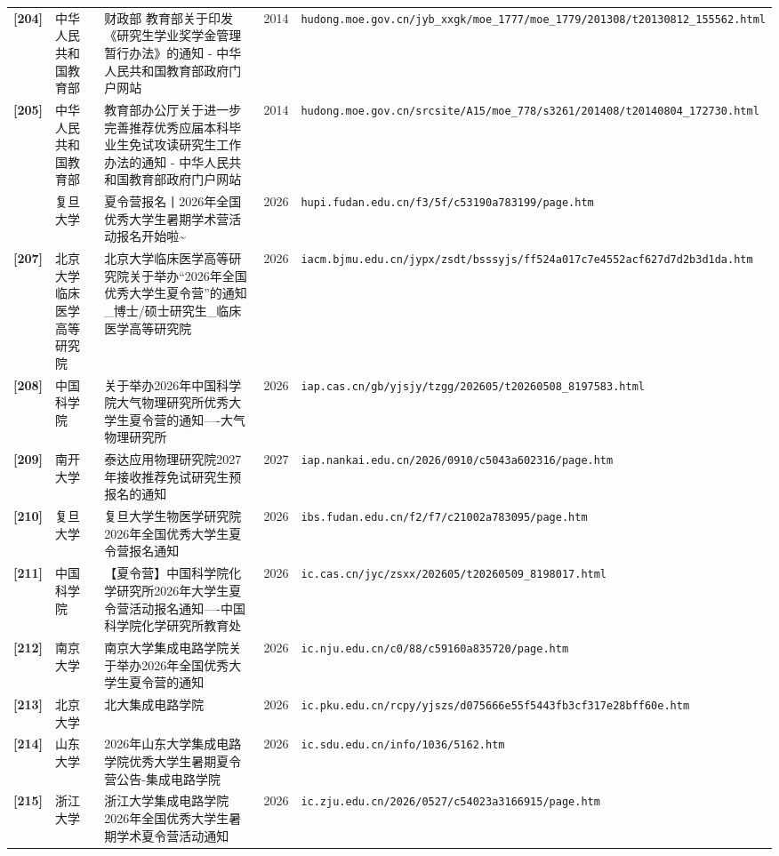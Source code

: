 {\begin{longtable}{@{}p{1.15cm}p{2.9cm}p{6.3cm}p{0.85cm}p{5.0cm}@{}}
\textbf{[204]} & 中华人民共和国教育部 & 财政部 教育部关于印发《研究生学业奖学金管理暂行办法》的通知 - 中华人民共和国教育部政府门户网站 & 2014 & \texttt{hudong.moe.gov.cn/jyb\_xxgk/moe\_1777/moe\_1779/201308/t20130812\_155562.html} \\
\textbf{[205]} & 中华人民共和国教育部 & 教育部办公厅关于进一步完善推荐优秀应届本科毕业生免试攻读研究生工作办法的通知 - 中华人民共和国教育部政府门户网站 & 2014 & \texttt{hudong.moe.gov.cn/srcsite/A15/moe\_778/s3261/201408/t20140804\_172730.html} \\
[206] & 复旦大学 & 夏令营报名丨2026年全国优秀大学生暑期学术营活动报名开始啦\textasciitilde{} & 2026 & \texttt{hupi.fudan.edu.cn/f3/5f/c53190a783199/page.htm} \\
\textbf{[207]} & 北京大学临床医学高等研究院 & 北京大学临床医学高等研究院关于举办“2026年全国优秀大学生夏令营”的通知\_博士/硕士研究生\_临床医学高等研究院 & 2026 & \texttt{iacm.bjmu.edu.cn/jypx/zsdt/bsssyjs/ff524a017c7e4552acf627d7d2b3d1da.htm} \\
\textbf{[208]} & 中国科学院 & 关于举办2026年中国科学院大气物理研究所优秀大学生夏令营的通知----大气物理研究所 & 2026 & \texttt{iap.cas.cn/gb/yjsjy/tzgg/202605/t20260508\_8197583.html} \\
\textbf{[209]} & 南开大学 & 泰达应用物理研究院2027年接收推荐免试研究生预报名的通知 & 2027 & \texttt{iap.nankai.edu.cn/2026/0910/c5043a602316/page.htm} \\
\textbf{[210]} & 复旦大学 & 复旦大学生物医学研究院2026年全国优秀大学生夏令营报名通知 & 2026 & \texttt{ibs.fudan.edu.cn/f2/f7/c21002a783095/page.htm} \\
\textbf{[211]} & 中国科学院 & 【夏令营】中国科学院化学研究所2026年大学生夏令营活动报名通知----中国科学院化学研究所教育处 & 2026 & \texttt{ic.cas.cn/jyc/zsxx/202605/t20260509\_8198017.html} \\
\textbf{[212]} & 南京大学 & 南京大学集成电路学院关于举办2026年全国优秀大学生夏令营的通知 & 2026 & \texttt{ic.nju.edu.cn/c0/88/c59160a835720/page.htm} \\
\textbf{[213]} & 北京大学 & 北大集成电路学院 & 2026 & \texttt{ic.pku.edu.cn/rcpy/yjszs/d075666e55f5443fb3cf317e28bff60e.htm} \\
\textbf{[214]} & 山东大学 & 2026年山东大学集成电路学院优秀大学生暑期夏令营公告-集成电路学院 & 2026 & \texttt{ic.sdu.edu.cn/info/1036/5162.htm} \\
\textbf{[215]} & 浙江大学 & 浙江大学集成电路学院2026年全国优秀大学生暑期学术夏令营活动通知 & 2026 & \texttt{ic.zju.edu.cn/2026/0527/c54023a3166915/page.htm} \\

\end{longtable}}
